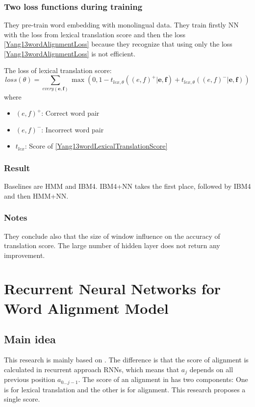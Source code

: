 \documentclass{article}
\begin{document}
\subsubsection{Two loss functions during training}
They pre-train word embedding with monolingual data.
They train firstly NN with the loss from lexical translation score and then the loss \eqref{Yang13wordAlignmentLoss} because they recognize that using only the loss \eqref{Yang13wordAlignmentLoss} is not efficient.

The loss of lexical translation score:
\begin{equation}
loss(\theta) = \sum_{every(\textbf{e},\textbf{f})} \max(0 , 1 - t_{lex, \theta}((e,f)^+ | \textbf{e},\textbf{f}) + t_{lex, \theta}((e,f)^- | \textbf{e},\textbf{f}) )
\end{equation}
where
\begin{itemize}
\item $(e,f)^+$: Correct word pair
\item $(e,f)^-$: Incorrect word pair
\item $t_{lex}$: Score of \eqref{Yang13wordLexicalTranslationScore}
\end{itemize}

\subsubsection{Result}
Baselines are HMM and IBM4. IBM4+NN takes the first place, followed by IBM4 and then HMM+NN.

\subsubsection{Notes}
They conclude also that the size of window influence on the accuracy of translation score.
The large number of hidden layer does not return any improvement.

\section{Recurrent Neural Networks for Word Alignment Model \citep{Tamura14recurrent}}

\subsection{Main idea}
This research is mainly based on \citep{Yang13word}. The difference is that the score of alignment is calculated in recurrent approach RNNs, which means that $a_j$ depends on all previous position $a_{0...j-1}$.
The score of an alignment in \citep{Yang13word} has two components: One is for lexical translation and the other is for alignment. This research proposes a single score.
\end{document}

